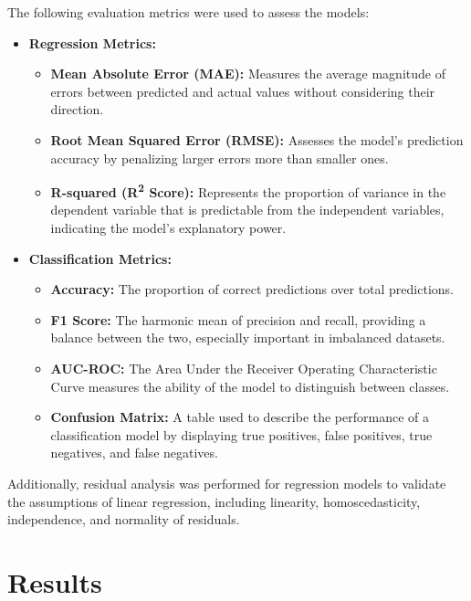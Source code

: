 \documentclass[manuscript,acmsmall,review,screen,authorversion=true]{acmart}
\begin{document}
The following evaluation metrics were used to assess the models:

\begin{itemize}
    \item \textbf{Regression Metrics:}
    \begin{itemize}
        \item \textbf{Mean Absolute Error (MAE):} Measures the average magnitude of errors between predicted and actual values without considering their direction.

        \item \textbf{Root Mean Squared Error (RMSE):} Assesses the model's prediction accuracy by penalizing larger errors more than smaller ones.

        \item \textbf{R-squared (R\textsuperscript{2} Score):} Represents the proportion of variance in the dependent variable that is predictable from the independent variables, indicating the model's explanatory power.
    \end{itemize}

    \item \textbf{Classification Metrics:}
    \begin{itemize}
        \item \textbf{Accuracy:} The proportion of correct predictions over total predictions.

        \item \textbf{F1 Score:} The harmonic mean of precision and recall, providing a balance between the two, especially important in imbalanced datasets.

        \item \textbf{AUC-ROC:} The Area Under the Receiver Operating Characteristic Curve measures the ability of the model to distinguish between classes.

        \item \textbf{Confusion Matrix:} A table used to describe the performance of a classification model by displaying true positives, false positives, true negatives, and false negatives.
    \end{itemize}
\end{itemize}

Additionally, residual analysis was performed for regression models to validate the assumptions of linear regression, including linearity, homoscedasticity, independence, and normality of residuals.

\section{Results}
\end{document}
